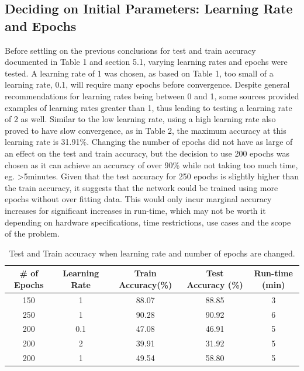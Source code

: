 \documentclass[twocolumn]{article}
\begin{document}
\subsection{Deciding on Initial Parameters: Learning Rate and Epochs}
Before settling on the previous conclusions for test and train accuracy documented in Table 1 and section 5.1, varying learning rates and epochs were tested. A learning rate of 1 was chosen, as based on Table 1, too small of a learning rate, 0.1, will require many epochs before convergence. Despite general recommendations for learning rates being between 0 and 1, some sources \cite{nielsen2} provided examples of learning rates greater than 1, thus leading to testing a learning rate of 2 as well. Similar to the low learning rate, using a high learning rate also proved to have slow convergence, as in Table 2, the maximum accuracy at this learning rate is 31.91\%. Changing the number of epochs did not have as large of an effect on the test and train accuracy, but the decision to use 200 epochs was chosen as it can achieve an accuracy of over 90\% while not taking too much time, eg. >5minutes. Given that the test accuracy for 250 epochs is slightly higher than the train accuracy, it suggests that the network could be trained using more epochs without over fitting data. This would only incur marginal accuracy increases for significant increases in run-time, which may not be worth it depending on hardware specifications, time restrictions, use cases and the scope of the problem. 
\begin{table}[h!]
\caption{Test and Train accuracy when learning rate and number of epochs are changed. }
\centering
\begin{adjustbox}{width=\columnwidth,center}
\begin{tabular}[t]{ ccccc}
\toprule
 \textbf{\# of Epochs}&\textbf{Learning Rate}&\textbf{Train Accuracy(\%)}&\textbf{Test Accuracy (\%)}&\textbf{Run-time (min)}\\[0.5ex]
 \midrule
150&1&88.07&88.85&3\\[0.5ex]
250&1&90.28&90.92&6\\[0.5ex]
200&0.1&47.08&46.91&5\\[0.5ex]
200&2&39.91&31.92&5\\[0.5ex]
 \midrule
 200&1&49.54&58.80&5\\[0.5ex]
 \bottomrule
\end{tabular}
\end{adjustbox}
\end{table}
\end{document}
